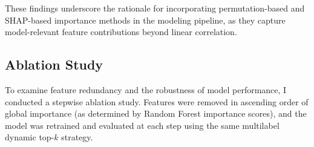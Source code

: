 \documentclass{article}
\begin{document}
These findings underscore the rationale for incorporating permutation-based and SHAP-based importance methods in the modeling pipeline, as they capture model-relevant feature contributions beyond linear correlation.

\subsection{Ablation Study}

To examine feature redundancy and the robustness of model performance, I conducted a stepwise ablation study. Features were removed in ascending order of global importance (as determined by Random Forest importance scores), and the model was retrained and evaluated at each step using the same multilabel dynamic top-$k$ strategy.

\begin{table}[H]
\centering
{}
\caption{Ablation study: effect of sequential feature removal on prediction accuracy. Features removed in ascending order of importance.}
\label{tab:ablation_study}
\end{table}
\end{document}

